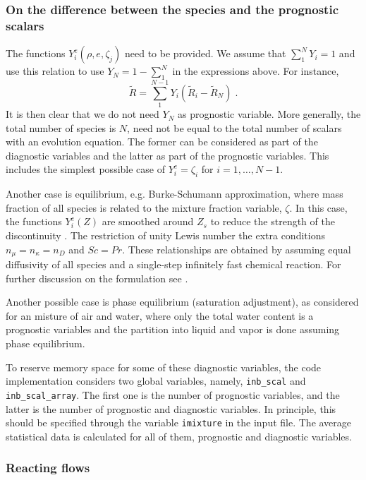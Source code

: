 \subsubsection{On the difference between the species and the prognostic scalars}

The functions $Y_i^e(\rho,e,\zeta_j)$ need to be provided. We assume that $\sum_1^NY_i=1$ and use this relation to use $Y_N=1-\sum_1^N$ in the expressions above. For instance,
\begin{equation}
    \tilde{R}=\sum_1^{N-1}Y_i(\tilde{R}_i-\tilde{R}_N) \;.
\end{equation}
It is then clear that we do not need $Y_N$ as prognostic variable. More generally, the total number of species is $N$, need not be equal to the total number of scalars with an evolution equation. The former can be considered as part of the diagnostic variables and the latter as part of the prognostic variables. This includes the simplest possible case of $Y_i^e = \zeta_i$ for $i=1,\ldots,N-1$. 

Another case is equilibrium, e.g. Burke-Schumann approximation, where mass fraction of all species is related to the mixture fraction variable, $\zeta$.  In this case, the functions $Y_i^e(Z)$ are smoothed around $Z_s$ to reduce the strength of the discontinuity \citep{Higuera:1994}. The restriction of unity Lewis number the extra conditions $n_\mu=n_\kappa=n_D$ and $Sc=Pr$. These relationships are obtained by assuming equal diffusivity of all species and a single-step infinitely fast chemical reaction.  For further discussion on the formulation see \cite{Williams:1985}.

Another possible case is phase equilibrium (saturation adjustment), as considered for an misture of air and water, where only the total water content is a prognostic variables and the partition into liquid and vapor is done assuming phase equilibrium. 

To reserve memory space for some of these diagnostic variables, the code implementation considers two global variables, namely, {\tt inb\_scal} and {\tt inb\_scal\_array}. The first one is the number of prognostic variables, and the latter is the number of prognostic and diagnostic variables. In principle, this should be specified through the variable {\tt imixture} in the input file. The average statistical data is calculated for all of them, prognostic and diagnostic variables.

\subsubsection{Reacting flows}

